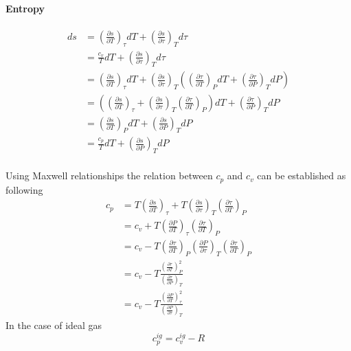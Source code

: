 \documentclass[11pt]{article}
\begin{document}
\paragraph{Entropy}
\begin{align}
ds &= \left(\frac{\partial s}{\partial T}\right)_{\tau} dT + \left(\frac{\partial s}{\partial \tau}\right)_{T} d\tau \\
   &= \frac{c_{v}}{T} dT + \left(\frac{\partial s}{\partial \tau}\right)_{T} d\tau \\
   &= \left(\frac{\partial s}{\partial T}\right)_{\tau} dT + \left(\frac{\partial s}{\partial \tau}\right)_{T} \left( \left(\frac{\partial \tau}{\partial T}\right)_{P} dT + \left(\frac{\partial \tau}{\partial P} \right)_{T} dP \right)\\
   &= \left(\left(\frac{\partial s}{\partial T}\right)_{\tau} + \left(\frac{\partial s}{\partial \tau}\right)_{T} \left(\frac{\partial \tau}{\partial T}\right)_{P} \right)dT + \left(\frac{\partial \tau}{\partial P} \right)_{T} dP \\
   &= \left(\frac{\partial s}{\partial T}\right)_{P} dT + \left(\frac{\partial s}{\partial P}\right)_{T} dP \\
   &= \frac{c_{p}}{T} dT + \left(\frac{\partial s}{\partial P}\right)_{T} dP \\
\end{align}

Using Maxwell relationships the relation between $c_{p}$ and $c_{v}$ can be established as following 
\begin{align}
c_{p} & = T\left(\frac{\partial s}{\partial T} \right)_{\tau} + T \left(\frac{\partial s}{\partial \tau} \right)_{T} \left(\frac{\partial \tau}{\partial T} \right)_{P} \\
      & = c_{v} + T \left(\frac{\partial P}{\partial T} \right)_{\tau} \left(\frac{\partial \tau}{\partial T} \right)_{P} \\
      & = c_{v} - T \left(\frac{\partial \tau}{\partial T} \right)_{P} \left(\frac{\partial P}{\partial \tau} \right)_{T} \left(\frac{\partial \tau}{\partial T} \right)_{P} \\
      & = c_{v} - T\frac{\left(\frac{\partial \tau}{\partial T} \right)_{P}^{2}}{\left(\frac{\partial \tau}{\partial P} \right)_{T}} \\
      & = c_{v} - T\frac{\left(\frac{\partial P}{\partial T} \right)_{\tau}^{2}}{\left(\frac{\partial P}{\partial \tau} \right)_{T}} 
      \label{eq:CpCvReal}
\end{align}
In the case of ideal gas 
\begin{equation}
c_{p}^{ig} = c_{v}^{ig} - R
\end{equation}
\end{document}
